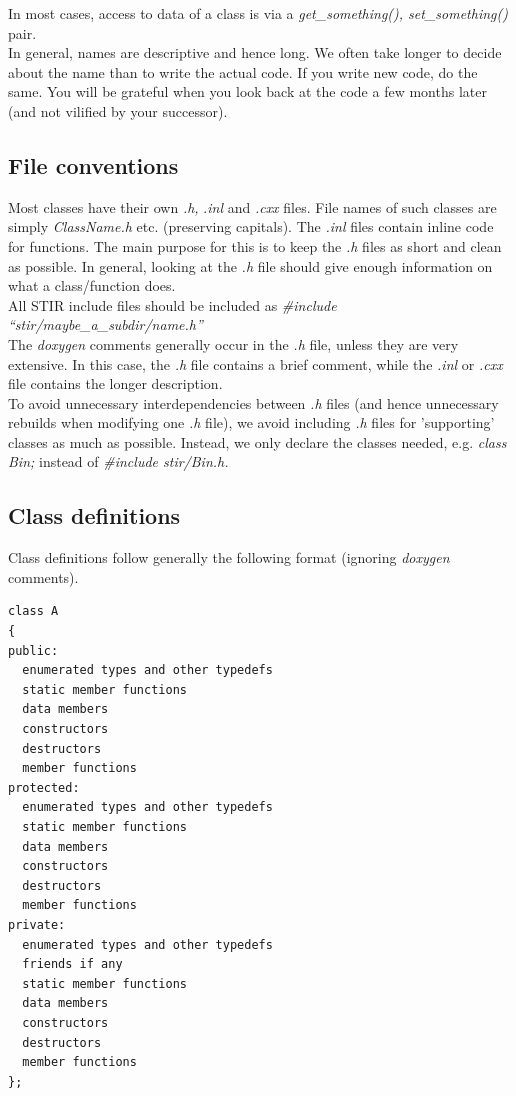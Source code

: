 \documentclass{article}
\begin{document}
In most cases, access to data of a class is via a \textit{get\_something(), 
set\_something()} pair.\\
In general, names are descriptive and hence long. We often take 
longer to decide about the name than to write the actual code. 
If you write new code, do the same. You will be grateful when 
you look back at the code a few months later (and not vilified 
by your successor). 

\subsection{
File conventions }

Most classes have their own \textit{.h,} .\textit{inl} and \textit{.cxx} files. 
File names of such classes are simply \textit{ClassName.h} {\nobreakspace}etc. 
(preserving capitals). The \textit{.inl} files contain inline code 
for functions. The main purpose for this is to keep the \textit{.h} 
files as short and clean as possible. In general, looking at 
the \textit{.h} file should give enough information on what a class/function 
does. \\
All STIR include files should be included as \textit{\#include ``stir/maybe\_a\_subdir/name.h''}\\
The \textit{doxygen} comments generally occur in the \textit{.h} file, unless 
they are very extensive. In this case, the \textit{.h} file contains 
a brief comment, while the \textit{.inl} or \textit{.cxx} file contains 
the longer description.\\
To avoid unnecessary interdependencies between \textit{.h} files (and 
hence unnecessary rebuilds when modifying one \textit{.h} file), we 
avoid including \textit{.h} files for 'supporting' classes as much 
as possible. Instead, we only declare the classes needed, e.g. \textit{class 
Bin;} instead of \textit{\#include stir/Bin.h.}



\subsection{
Class definitions}

Class definitions follow generally the following format (ignoring \textit{doxygen} 
comments).

\begin{verbatim}
class A
{
public: 
  enumerated types and other typedefs 
  static member functions  
  data members  
  constructors 
  destructors 
  member functions
protected: 
  enumerated types and other typedefs 
  static member functions 
  data members 
  constructors 
  destructors 
  member functions
private: 
  enumerated types and other typedefs 
  friends if any 
  static member functions 
  data members 
  constructors 
  destructors 
  member functions
};
\end{verbatim}
\end{document}

